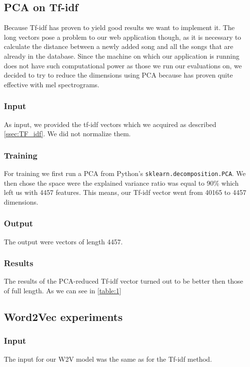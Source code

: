 \subsection{PCA on Tf-idf}\label{ssec:PCA_on_tf_idf}

Because Tf-idf has proven to yield good results we want to implement it. The long vectors pose a problem to our web application though, as it is necessary to calculate the distance between a newly added song and all the songs that are already in the database. Since the machine on which our application is running does not have such computational power as those we run our evaluations on, we decided to try to reduce the dimensions using PCA because has proven quite effective with mel spectrograms.

\subsubsection{Input}
As input, we provided the tf-idf vectors which we acquired as described \ref{ssec:TF_idf}. We did not normalize them.

\subsubsection{Training}
For training we first run a PCA from Python's \texttt{sklearn.decomposition.PCA}. We then chose the space were the explained variance ratio was equal to 90\% which left us with 4457 features. This means, our Tf-idf vector went from 40165 to 4457 dimensions. 

\subsubsection{Output}
The output were vectors of length 4457.

\subsubsection{Results}
The results of the PCA-reduced Tf-idf vector turned out to be better then those of full length. As we can see in \ref{table:1} 

\subsection{Word2Vec experiments}\label{ssec:w2v_experiments}

\subsubsection{Input}
The input for our W2V model was the same as for the Tf-idf method.

